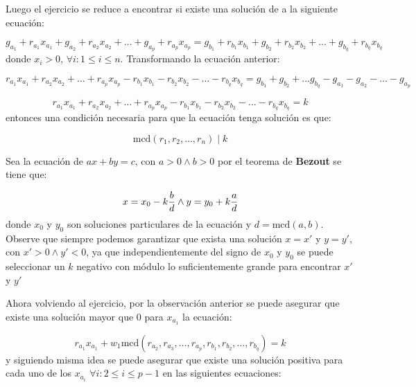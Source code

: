 \documentclass{article}
\begin{document}
Luego el ejercicio se reduce a encontrar si existe una solución de a la siguiente ecuación:

\begin{equation}
    g_{a_1}+r_{a_1}x_{a_1}+g_{a_2}+r_{a_2}x_{a_2}+\ldots +g_{a_p}+r_{a_p}x_{a_p}=g_{b_1}+r_{b_1}x_{b_1}+g_{b_2}+r_{b_2}x_{b_2}+\ldots +g_{b_q}+r_{b_q}x_{b_q}
\end{equation}
donde  $x_i > 0$, $\forall i : 1\leq i\leq n$. Transformando la ecuación anterior:

\begin{equation}
    r_{a_1}x_{a_1}+r_{a_2}x_{a_2}+\ldots +r_{a_p}x_{a_p}-r_{b_1}x_{b_1}-r_{b_2}x_{b_2}-\ldots -r_{b_q}x_{b_q}=g_{b_1}+g_{b_2}+\ldots g_{b_q}-g_{a_1}-g_{a_2}-\ldots -g_{a_p}
\end{equation}

\begin{equation}
    r_{a_1}x_{a_1}+r_{a_2}x_{a_2}+\ldots +r_{a_p}x_{a_p}-r_{b_1}x_{b_1}-r_{b_2}x_{b_2}-\ldots -r_{b_q}x_{b_q}=k
\end{equation}
entonces una condición necesaria para que la ecuación tenga solución es que:

\begin{equation}
    \text{mcd}(r_1, r_2, \ldots, r_n) \mid k
\end{equation}

Sea la ecuación de $ax+by=c$, con $a>0 \wedge b>0$ por el teorema de \textbf{Bezout} se tiene que:

\begin{equation}
    x=x_0-k{b\over d} \wedge y=y_0+k{a\over d}
\end{equation}
donde $x_0$ y $y_0$ son soluciones particulares de la ecuación y $d=\text{mcd}(a,b)$. Observe que siempre podemos garantizar
que exista una solución $x=x'$ y $y=y'$, con $x'>0 \wedge y'<0$, ya que independientemente del signo de $x_0$ y $y_0$ se puede
seleccionar un $k$ negativo con módulo lo suficientemente grande para encontrar $x'$ y $y'$

Ahora volviendo al ejercicio, por la observación anterior se puede asegurar que existe una solución mayor que 0 para $x_{a_1}$ la ecuación:

\begin{equation}
    r_{a_1}x_{a_1}+w_1\text{mcd}(r_{a_2},r_{a_3},\ldots,r_{a_p},r_{b_1},r_{b_2},\ldots,r_{b_q})=k
\end{equation}
y siguiendo misma idea se puede asegurar que existe una solución positiva para cada uno de los $x_{a_i}$ $\forall i: 2\leq i\leq p-1$  en las siguientes ecuaciones:
\end{document}
